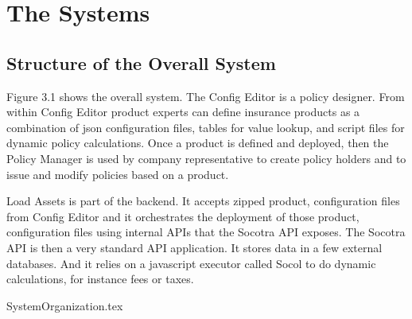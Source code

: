 \chapter{The Systems}
\label{intro04} %


\section{Structure of the Overall System}
\label{sec:03:1}

Figure 3.1 shows the overall system. The Config Editor is a policy designer. From within Config
Editor product experts can define insurance products as a combination of json configuration
files, tables for value lookup, and script files for dynamic policy calculations. Once a product
is defined and deployed, then the Policy Manager is used by company representative to create
policy holders and to issue and modify policies based on a product.

Load Assets is part of the backend. It accepts zipped product, configuration files from Config Editor and
it orchestrates the deployment of those product, configuration files using internal APIs that the
Socotra API exposes. The Socotra API is then a very standard API application. It stores data in
a few external databases. And it relies on a javascript executor called Socol to do dynamic calculations,
for instance fees or taxes.

{SystemOrganization.tex}

